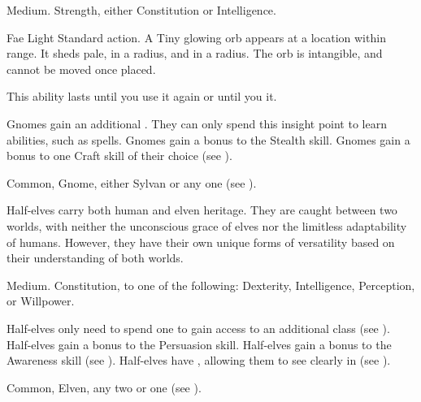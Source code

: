    Medium.
    Strength, either  Constitution or  Intelligence.
  \begin{raggeditemize}
    \begin{activeability}{Fae Light}
      \abilityusagetime Standard action.
      \rankline
      A Tiny glowing orb appears at a location within \rngmed range.
      It sheds pale,  in a \areasmall radius, and  in a \areamed radius.
      The orb is intangible, and cannot be moved once placed.

      This ability lasts until you use it again or until you  it.
    \end{activeability}
     Gnomes gain an additional .
      They can only spend this insight point to learn \magical abilities, such as spells.
     Gnomes gain a  bonus to the Stealth skill.
     Gnomes gain a  bonus to one Craft skill of their choice (see ).
  \end{raggeditemize}
   Common, Gnome, either Sylvan or any one  (see ).


  Half-elves carry both human and elven heritage.
  They are caught between two worlds, with neither the unconscious grace of elves nor the limitless adaptability of humans.
  However, they have their own unique forms of versatility based on their understanding of both worlds.

   Medium.
    Constitution,  to one of the following: Dexterity, Intelligence, Perception, or Willpower.
  \begin{raggeditemize}
     Half-elves only need to spend one  to gain access to an additional class (see ).
     Half-elves gain a  bonus to the Persuasion skill.
     Half-elves gain a  bonus to the Awareness skill (see ).
     Half-elves have , allowing them to see clearly in  (see ).
  \end{raggeditemize}
   Common, Elven, any two  or one  (see ).

